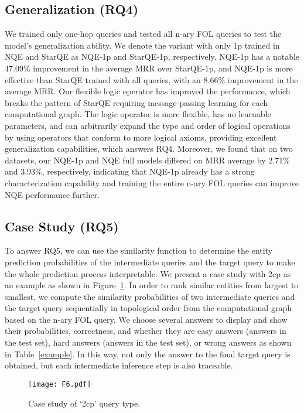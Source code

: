 \documentclass[letterpaper]{article} \usepackage{aaai23}  \usepackage{times}  \usepackage{helvet}  \usepackage{courier}  \usepackage[hyphens]{url}  \usepackage{graphicx} \urlstyle{rm} \def\UrlFont{\rm}  \usepackage{natbib}  \usepackage{caption} \frenchspacing  \setlength{\pdfpagewidth}{8.5in}  \setlength{\pdfpageheight}{11in}  \usepackage{algorithm}
\begin{document}
\subsection{Generalization (RQ4)} 
We trained only one-hop queries and tested all n-ary FOL queries to test the model's generalization ability. We denote the variant with only 1p trained in NQE and StarQE as NQE-1p and StarQE-1p, respectively. NQE-1p has a notable 47.09\% improvement in the average MRR over StarQE-1p, and NQE-1p is more effective than StarQE trained with all queries, with an 8.66\% improvement in the average MRR. Our flexible logic operator has improved the performance, which breaks the pattern of StarQE requiring message-passing learning for each computational graph. The logic operator is more flexible, has no learnable parameters, and can arbitrarily expand the type and order of logical operations by using operators that conform to more logical axioms, providing excellent generalization capabilities, which answers RQ4. Moreover, we found that on two datasets, our NQE-1p and NQE full models differed on MRR average by 2.71\% and 3.93\%, respectively, indicating that NQE-1p already has a strong characterization capability and training the entire n-ary FOL queries can improve NQE performance further.


\subsection{Case Study (RQ5)} 
To answer RQ5, we can use the similarity function to determine the entity prediction probabilities of the intermediate queries  and the target query  to make the whole prediction process interpretable. We present a case study with 2cp as an example as shown in Figure~\ref{f6}. In order to rank similar entities from largest to smallest, we compute the similarity probabilities of two intermediate queries and the target query sequentially in topological order from the computational graph based on the n-ary FOL query. We choose several answers to display and show their probabilities, correctness, and whether they are easy answers (answers in the test set), hard answers (answers in the test set), or wrong answers as shown in Table~\ref{example}. In this way, not only the answer to the final target query is obtained, but each intermediate inference step is also traceable.

\begin{figure}[t]
\centering
\texttt{[image: F6.pdf]}
\caption{Case study of `2cp' query type.}
\label{f6}
\end{figure}
\end{document}
